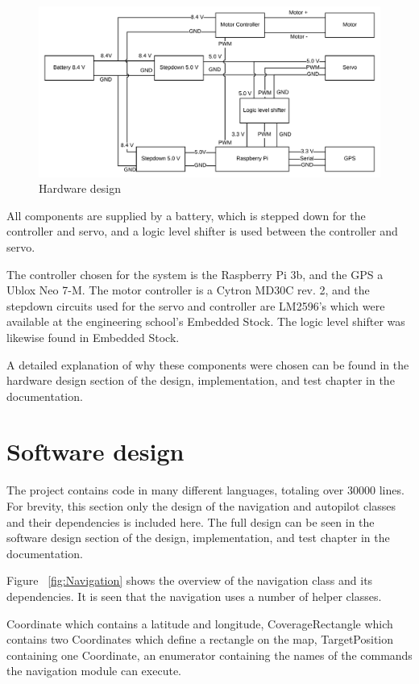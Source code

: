 \begin{figure}[H]
\centering
\includegraphics[width=1\linewidth]{Hardware_design}
\caption{Hardware design}
\label{fig:hardware_design}
\end{figure}

All components are supplied by a battery, which is stepped down for the controller and servo, and a logic level shifter is used between the controller and servo.

The controller chosen for the system is the Raspberry Pi 3b, and the GPS a Ublox Neo 7-M. The motor controller is a Cytron MD30C rev. 2, and the stepdown circuits used for the servo and controller are LM2596's which were available at the engineering school's Embedded Stock. The logic level shifter was likewise found in Embedded Stock.

A detailed explanation of why these components were chosen can be found in the hardware design section of the design, implementation, and test chapter in the documentation.

\section{Software design}

The project contains code in many different languages, totaling over 30000 lines. For brevity, this section only the design of the navigation and autopilot classes and their dependencies is included here. The full design can be seen in the software design section of the design, implementation, and test chapter in the documentation. 

Figure ~\ref{fig:Navigation} shows the overview of the navigation class and its dependencies. It is seen that the navigation uses a number of helper classes.

Coordinate which contains a latitude and longitude, CoverageRectangle which contains two Coordinates which define a rectangle on the map, TargetPosition containing one Coordinate, an enumerator containing the names of the commands the navigation module can execute.

